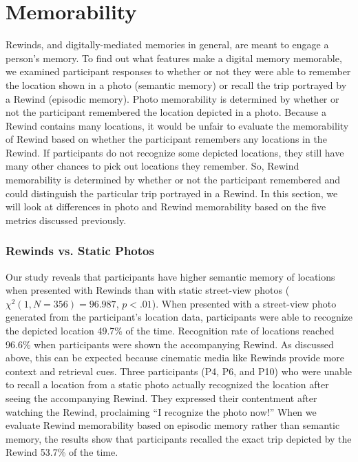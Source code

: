 \documentclass{sigchi}
\begin{document}
\section{Memorability}
Rewinds, and digitally-mediated memories in general, are meant to engage a person's memory. To find out what features make a digital memory memorable, we examined participant responses to whether or not they were able to remember the location shown in a photo (semantic memory) or recall the trip portrayed by a Rewind (episodic memory). Photo memorability is determined by whether or not the participant remembered the location depicted in a photo. Because a Rewind contains many locations, it would be unfair to evaluate the memorability of Rewind based on whether the participant remembers any locations in the Rewind. If participants do not recognize some depicted locations, they still have many other chances to pick out locations they remember. So, Rewind memorability is determined by whether or not the participant remembered and could distinguish the particular trip portrayed in a Rewind. In this section, we will look at differences in photo and Rewind memorability based on the five metrics discussed previously.

\subsubsection{Rewinds vs. Static Photos} 
Our study reveals that participants have higher semantic memory of locations when presented with Rewinds than with static street-view photos ($\chi^2(1, N=356) = 96.987$, $p <.01$). When presented with a street-view photo generated from the participant's location data, participants were able to recognize the depicted location 49.7\% of the time. Recognition rate of locations reached 96.6\% when participants were shown the accompanying Rewind. As discussed above, this can be expected because cinematic media like Rewinds provide more context and retrieval cues. Three participants (P4, P6, and P10) who were unable to recall a location from a static photo actually recognized the location after seeing the accompanying Rewind. They expressed their contentment after watching the Rewind, proclaiming ``I recognize the photo now!'' When we evaluate Rewind memorability based on episodic memory rather than semantic memory, the results show that participants recalled the exact trip depicted by the Rewind 53.7\% of the time.
\end{document}
